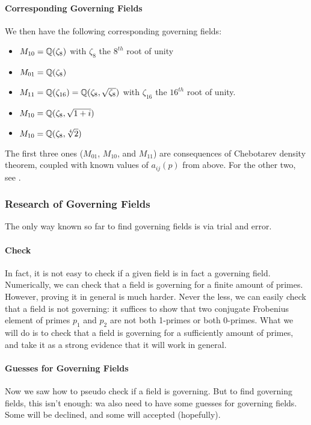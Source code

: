 \paragraph{Corresponding Governing Fields}
We then have the following corresponding governing fields:
\begin{itemize}
	\item $M_{10} = \mathbb{Q}(\zeta_8)$ with $\zeta_8$ the $8^{th}$ root of unity
	\item $M_{01} = \mathbb{Q}(\zeta_8)$
	\item $M_{11} = \mathbb{Q}(\zeta_{16}) = \mathbb{Q}(\zeta_8, \sqrt{\zeta_8})$ with $\zeta_{16}$ the $16^{th}$ root of unity.
	\item $M_{10} = \mathbb{Q}(\zeta_8, \sqrt{1+i})$
	\item $M_{10} = \mathbb{Q}(\zeta_8, \sqrt[4]{2})$
\end{itemize}
The first three ones ($M_{01}$, $M_{10}$, and $M_{11}$) are consequences of Chebotarev density theorem, coupled with known values of $a_{ij}(p)$ from above.
For the other two, see \cite[§7]{StructureAlgebreHecke}.



\subsubsection{Research of Governing Fields}
The only way known so far to find governing fields is via trial and error.
\paragraph{Check}
In fact, it is not easy to check if a given field is in fact a governing field.
Numerically, we can check that a field is governing for a finite amount of primes.
However, proving it in general is much harder.
Never the less, we can easily check that a field is not governing: it suffices to show that two conjugate Frobenius element of primes $p_1$ and $p_2$ are not both 1-primes or both 0-primes.
What we will do is to check that a field is governing for a sufficiently amount of primes, and take it as a strong evidence that it will work in general. 

\paragraph{Guesses for Governing Fields}
Now we saw how to pseudo check if a field is governing.
But to find governing fields, this isn't enough: wa also need to have some guesses for governing fields.
Some will be declined, and some will accepted (hopefully).

